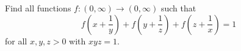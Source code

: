 Find all functions $f:\left(0,\infty\right)\to\left(0,\infty\right)$ such that \[f\left(x+\frac{1}{y}\right)+f\left(y+\frac{1}{z}\right)+f\left(z+\frac{1}{x}\right)=1\] for all $x,y,z>0$ with $xyz =1$.